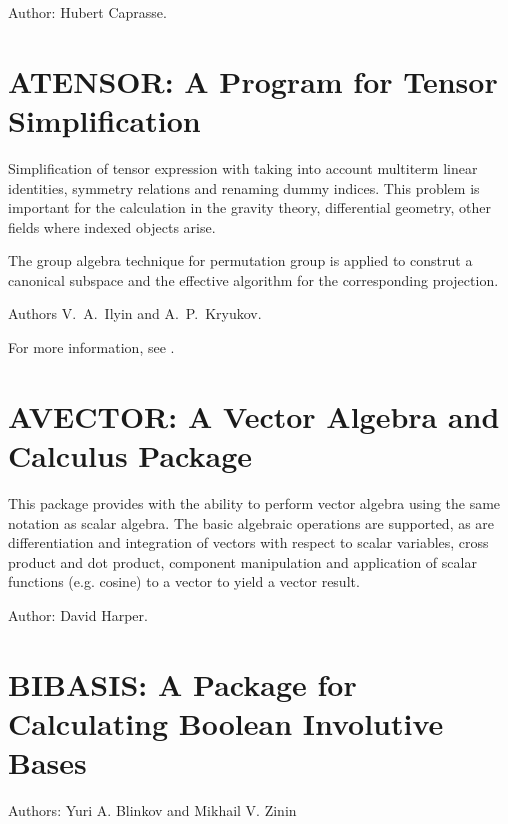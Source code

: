Author: Hubert Caprasse.



\newpage

\section{ATENSOR: A \REDUCE Program for Tensor Simplification}

Simplification of tensor expression with taking into account multiterm linear
identities, symmetry relations and renaming dummy indices. This problem is important
for the calculation in the gravity theory, differential geometry,
other fields where indexed objects arise.

The group algebra technique for permutation group is applied to construt a canonical
subspace and the effective algorithm for the corresponding projection.

Authors V.~A.~Ilyin and A.~P.~Kryukov.

For more information, see \cite{Ilyin:96}.

%

\newpage

\section{AVECTOR: A Vector Algebra and Calculus Package}

This package provides \REDUCE with the ability to perform vector algebra
using the same notation as scalar algebra.  The basic algebraic operations
are supported, as are differentiation and integration of vectors with
respect to scalar variables, cross product and dot product, component
manipulation and application of scalar functions (e.g. cosine) to a vector
to yield a vector result.

Author: David Harper.



\newpage

\section{BIBASIS: A Package for Calculating Boolean Involutive Bases}
 \label{BIBASIS}

Authors: Yuri A. Blinkov and Mikhail V. Zinin



\newpage

